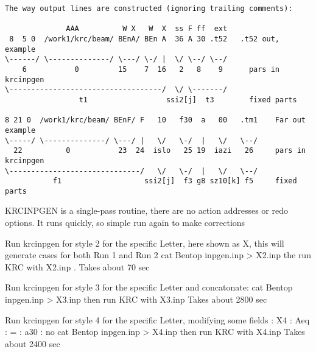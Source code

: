 \documentclass{article}
\begin{document}
\begin{verbatim}
The way output lines are constructed (ignoring trailing comments):

              AAA          W X   W  X  ss F ff  ext
 8  5 0  /work1/krc/beam/ BEnA/ BEn A  36 A 30 .t52   .t52 out, example
\------/ \--------------/ \---/ \-/ |  \/ \--/ \--/
    6           0         15    7  16   2   8    9      pars in krcinpgen
\-----------------------------------/  \/ \-------/
                 t1                  ssi2[j]  t3        fixed parts

8 21 0  /work1/krc/beam/ BEnF/ F   10   f30  a   00   .tm1    Far out example
\-----/ \--------------/ \---/ |   \/   \-/  |   \/   \--/   
  22          0           23  24  islo   25 19  iazi   26     pars in krcinpgen
\------------------------------/   \/   \-/  |   \/   \--/ 
           f1                   ssi2[j]  f3 g8 sz10[k] f5     fixed parts
\end{verbatim} 

KRCINPGEN is a single-pass routine, there are no action addresses or redo options. It runs quickly, so simple run again to make corrections

Run krcinpgen for style 2 for the specific Letter, here shown as X, this will generate cases for both Run 1 and Run 2
\qi cat Bentop  inpgen.inp > X2.inp
\qi the run KRC with X2.inp . Takes about 70 sec

Run krcinpgen for style 3 for the specific Letter and concatonate:
\qi cat Bentop  inpgen.inp > X3.inp
\qi then run KRC with X3.inp  Takes about 2800 sec

Run krcinpgen for style 4 for the specific Letter, modifying some fields
: X4
: Aeq
: = 
: a30
: no
\qi  cat Bentop  inpgen.inp > X4.inp
\qi then run KRC with X4.inp  Takes about 2400 sec
 
\end{document}
